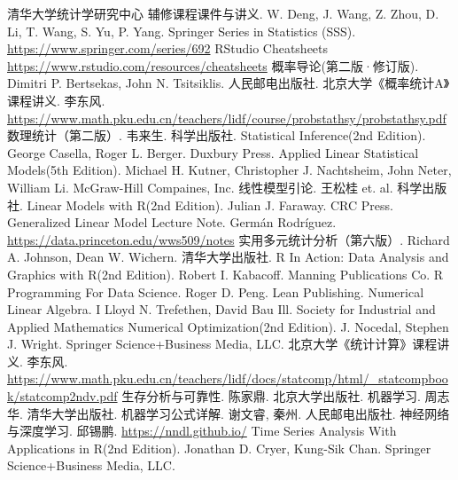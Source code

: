 \begin{thebibliography}{99}
    清华大学统计学研究中心 辅修课程课件与讲义. W. Deng, J. Wang, Z. Zhou, D. Li, T. Wang, S. Yu, P. Yang.
    Springer Series in Statistics (SSS). \url{https://www.springer.com/series/692}
    RStudio Cheatsheets \url{https://www.rstudio.com/resources/cheatsheets}
    概率导论(第二版·修订版). Dimitri P. Bertsekas, John N. Tsitsiklis. 人民邮电出版社.
    北京大学《概率统计A》课程讲义. 李东风. \url{https://www.math.pku.edu.cn/teachers/lidf/course/probstathsy/probstathsy.pdf}
    数理统计（第二版）. 韦来生. 科学出版社.
    Statistical Inference(2nd Edition). George Casella, Roger L. Berger. Duxbury Press.
    Applied Linear Statistical Models(5th Edition). Michael H. Kutner, Christopher J. Nachtsheim, John Neter, William Li. McGraw-Hill Compaines, Inc.
    线性模型引论. 王松桂 et. al. 科学出版社.
    Linear Models with R(2nd Edition). Julian J. Faraway. CRC Press.
    Generalized Linear Model Lecture Note. Germán Rodríguez. \url{https://data.princeton.edu/wws509/notes}
    实用多元统计分析（第六版）. Richard A. Johnson, Dean W. Wichern. 清华大学出版社.
    R In Action: Data Analysis and Graphics with R(2nd Edition). Robert I. Kabacoff. Manning Publications Co.
    R Programming For Data Science. Roger D. Peng. Lean Publishing.
    Numerical Linear Algebra. I Lloyd N. Trefethen, David Bau Ill. Society for Industrial and Applied Mathematics
    Numerical Optimization(2nd Edition). J. Nocedal, Stephen J. Wright. Springer Science+Business Media, LLC. 
    北京大学《统计计算》课程讲义. 李东风. \url{https://www.math.pku.edu.cn/teachers/lidf/docs/statcomp/html/_statcompbook/statcomp2ndv.pdf}
    生存分析与可靠性. 陈家鼎. 北京大学出版社.
    机器学习. 周志华. 清华大学出版社.
    机器学习公式详解. 谢文睿, 秦州. 人民邮电出版社.
    神经网络与深度学习. 邱锡鹏. \url{https://nndl.github.io/}
    Time Series Analysis With Applications in R(2nd Edition). Jonathan D. Cryer, Kung-Sik Chan. Springer Science+Business Media, LLC.

\end{thebibliography}
